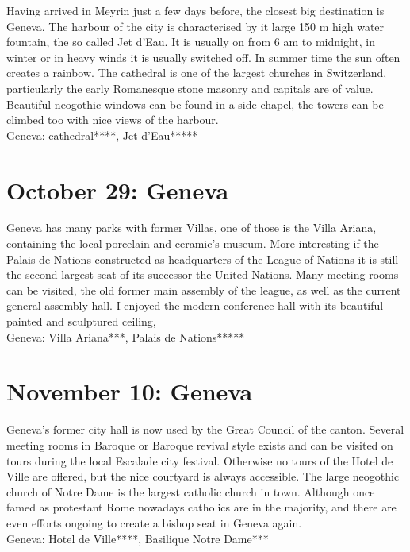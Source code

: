 Having arrived in Meyrin just a few days before, the closest big destination is Geneva. The harbour of the city is characterised by it large 150 m high water fountain, the so called Jet d'Eau. It is usually on from 6 am to midnight, in winter or in heavy winds it is usually switched off. In summer time the sun often creates a rainbow. The cathedral is one of the largest churches in Switzerland, particularly the early Romanesque stone masonry and capitals are of value. Beautiful neogothic windows can be found in a side chapel, the towers can be climbed too with nice views of the harbour.\\

Geneva: cathedral****, Jet d'Eau*****

\section{October 29: Geneva}
\label{2006:GenevaII}

Geneva has many parks with former Villas, one of those is the Villa Ariana, containing the local porcelain and ceramic's museum. More interesting if the Palais de Nations constructed as headquarters of the League of Nations it is still the second largest seat of its successor the United Nations. Many meeting rooms can be visited, the old former main assembly of the league, as well as the current general assembly hall. I enjoyed the modern conference hall with its beautiful painted and sculptured ceiling,\\

Geneva: Villa Ariana***, Palais de Nations*****

\section{November 10: Geneva}
\label{2006:GenevaIII}

Geneva's former city hall is now used by the Great Council of the canton. Several meeting rooms in Baroque or Baroque revival style exists and can be visited on tours during the local Escalade city festival. Otherwise no tours of the Hotel de Ville are offered, but the nice courtyard is always accessible. The large neogothic church of Notre Dame is the largest catholic church in town. Although once famed as protestant Rome nowadays catholics are in the majority, and there are even efforts ongoing to create a bishop seat in Geneva again.\\

Geneva: Hotel de Ville****, Basilique Notre Dame***

